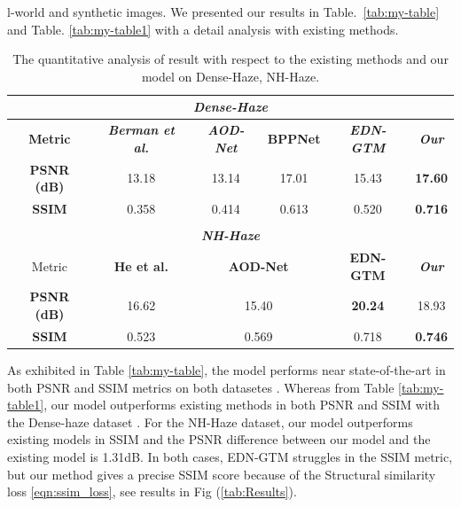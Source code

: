 l-world and synthetic images. We presented our results in  Table.~\eqref{tab:my-table} and Table. \eqref{tab:my-table1} with a detail analysis with existing methods.
\label{comparing}

\begin{table}[h]
\centering
\caption{The quantitative analysis of result  with respect to the existing  methods and our model on Dense-Haze, NH-Haze.
}
\label{tab:my-table1}
\begin{tabular}{cccccc}
\multicolumn{6}{c}{\textit{\textbf{Dense-Haze}}   \cite{dense_haze} }                                      \\ \hline
\textbf{Metric} & \textit{\textbf{Berman et al.}} \cite{prior1} & \textit{\textbf{AOD-Net}} \cite{aod} & \textbf{BPPNet} \cite{bppnet_sota} & \textit{\textbf{EDN-GTM}} \cite{sec_sota} & \textit{\textbf{Our}} \\ \hline
\textbf{PSNR (dB)} & 13.18 & 13.14       & 17.01       & 15.43          & \textbf{17.60} \\
\textbf{SSIM}      & 0.358 & 0.414       & 0.613       & 0.520          & \textbf{0.716} \\ \hline
\multicolumn{6}{l}{}                                                                     \\
\multicolumn{6}{c}{\textit{\textbf{NH-Haze}}  \cite{nh_haze}}                                           \\ \hline
Metric          & \textbf{He et al.}  \cite{he}            & \multicolumn{2}{c}{\textbf{AOD-Net} \cite{aod}}       & \textbf{EDN-GTM} \cite{sec_sota}         & \textit{\textbf{Our}} \\ \hline
\textbf{PSNR (dB)} & 16.62 & \multicolumn{2}{c}{15.40} & \textbf{20.24} & 18.93          \\
\textbf{SSIM}      & 0.523 & \multicolumn{2}{c}{0.569} & 0.718          & \textbf{0.746} \\ \hline
\end{tabular}%
\end{table}
As exhibited in Table \eqref{tab:my-table}, the model performs near state-of-the-art in both PSNR and SSIM metrics on both datasetes \cite{i_haze, o_haze}. Whereas from Table \eqref{tab:my-table1}, our model outperforms existing methods in both PSNR and SSIM with the Dense-haze dataset \cite{dense_haze}. For the NH-Haze \cite{nh_haze} dataset, our model outperforms existing models in SSIM and the PSNR difference between our model and the existing model is 1.31dB. In both cases, EDN-GTM \cite{sec_sota} struggles in the SSIM metric, but our method gives a precise SSIM score because of the Structural similarity loss \eqref{eqn:ssim_loss}, see results in Fig (\ref{tab:Results}).
